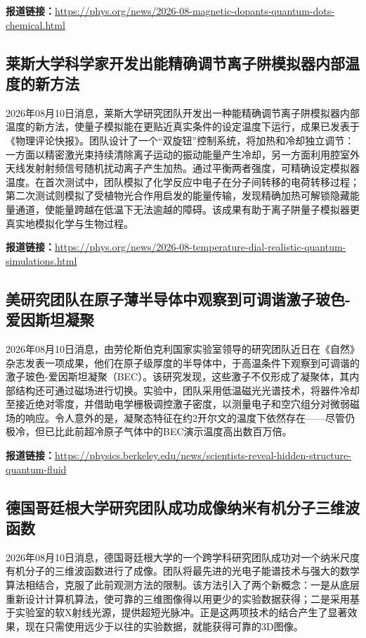 \documentclass[12pt,a4paper]{ctexart}
\begin{document}
\noindent\textbf{报道链接：}\url{https://phys.org/news/2026-08-magnetic-dopants-quantum-dots-chemical.html}

\subsection{ 莱斯大学科学家开发出能精确调节离子阱模拟器内部温度的新方法 }

2026年08月10日消息，莱斯大学研究团队开发出一种能精确调节离子阱模拟器内部温度的新方法，使量子模拟能在更贴近真实条件的设定温度下运行，成果已发表于《物理评论快报》。团队设计了一个“双旋钮”控制系统，将加热和冷却独立调节：一方面以精密激光束持续清除离子运动的振动能量产生冷却，另一方面利用腔室外天线发射射频信号随机扰动离子产生加热。通过平衡两者强度，可精确设定模拟器温度。在首次测试中，团队模拟了化学反应中电子在分子间转移的电荷转移过程；第二次测试则模拟了受植物光合作用启发的能量传输，发现精确加热可解锁隐藏能量通道，使能量跨越在低温下无法逾越的障碍。该成果有助于离子阱量子模拟器更真实地模拟化学与生物过程。

\noindent\textbf{报道链接：}\url{https://phys.org/news/2026-08-temperature-dial-realistic-quantum-simulations.html}

\subsection{ 美研究团队在原子薄半导体中观察到可调谐激子玻色-爱因斯坦凝聚 }

2026年08月10日消息，由劳伦斯伯克利国家实验室领导的研究团队近日在《自然》杂志发表一项成果，他们在原子级厚度的半导体中，于高温条件下观察到可调谐的激子玻色-爱因斯坦凝聚（BEC）。该研究发现，这些激子不仅形成了凝聚体，其内部结构还可通过磁场进行切换。实验中，团队采用低温磁光光谱技术，将器件冷却至接近绝对零度，并借助电学栅极调控激子密度，以测量电子和空穴组分对微弱磁场的响应。令人意外的是，凝聚态特征在约2开尔文的温度下依然存在——尽管仍极冷，但已比此前超冷原子气体中的BEC演示温度高出数百万倍。

\noindent\textbf{报道链接：}\url{https://physics.berkeley.edu/news/scientists-reveal-hidden-structure-quantum-fluid}

\subsection{ 德国哥廷根大学研究团队成功成像纳米有机分子三维波函数 }

2026年08月10日消息，德国哥廷根大学的一个跨学科研究团队成功对一个纳米尺度有机分子的三维波函数进行了成像。团队将最先进的光电子能谱技术与强大的数学算法相结合，克服了此前观测方法的限制。该方法引入了两个新概念：一是从底层重新设计计算机算法，使可靠的三维图像得以用更少的实验数据获得；二是采用基于实验室的软X射线光源，提供超短光脉冲。正是这两项技术的结合产生了显著效果，现在只需使用远少于以往的实验数据，就能获得可靠的3D图像。
\end{document}
